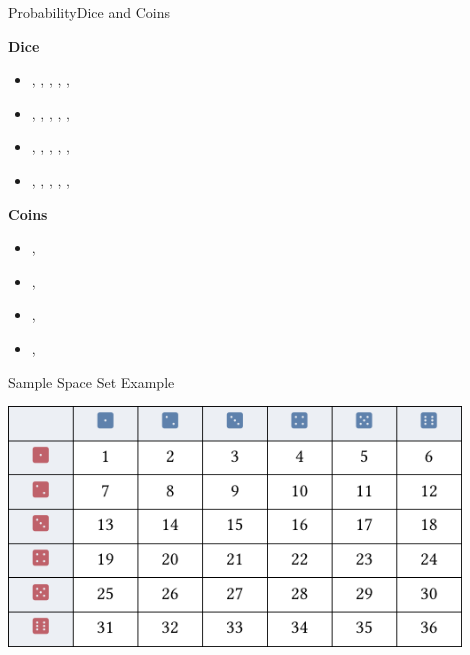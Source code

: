 \documentclass[aspectratio=169, sectionpages]{beamer}
\begin{document}
\begin{frame}[c]{Probability}{Dice and Coins}
	\hfill\\
	\begin{minipage}[t]{0.45\textwidth}
		\vspace{0pt}
		\textbf{Dice}
		\begin{itemize}
			\item \gdicei, \gdiceii, \gdiceiii, \gdiceiv, \gdicev, \gdicevi
			\item \bdicei, \bdiceii, \bdiceiii, \bdiceiv, \bdicev, \bdicevi
			\item \abdicei, \abdiceii, \abdiceiii, \abdiceiv, \abdicev, \abdicevi
			\item \rdicei, \rdiceii, \rdiceiii, \rdiceiv, \rdicev, \rdicevi
		\end{itemize}
		\textbf{Coins}
		\begin{itemize}
			\item \gcheads, \gctails
			\item \bcheads, \bctails
			\item \abcheads, \abctails
			\item \rcheads, \rctails
		\end{itemize}
	\end{minipage}
	\hspace{0.05\textwidth}
	\begin{minipage}[t]{0.45\textwidth}
		\vspace{0pt}
		\begin{exampleblock}{Sample Space Set Example}
			\begin{center}
				\includegraphics[width=0.9\textwidth]{imgs.tikz.05c9}
			\end{center}
		\end{exampleblock}
	\end{minipage}
	\hfill


\end{frame}
\end{document}

